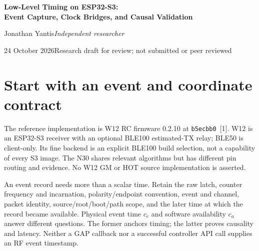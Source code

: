 \documentclass[10pt,letterpaper]{article}
\newcommand{\codepin}{\texttt{b5ecbb0}}
\begin{document}
\begin{center}
{\LARGE\bfseries Low-Level Timing on ESP32-S3:\\[3pt] Event Capture, Clock Bridges, and Causal Validation}\par
\vspace{7pt}Jonathan Yantis\quad\textit{Independent researcher}\par
24 October 2026\quad Research draft for review; not submitted or peer reviewed
\end{center}
\vspace{-4pt}
\begin{abstract}\noindent
Nanosecond arithmetic is useful only after a timestamp identifies a physical event, its clock domain, and the model available when that event occurred. This implementation paper explains the current PToB ESP32-S3 techniques: a continuous 80 MHz MCPWM capture counter, exact retained-packet association, driver-owned software latches, narrow instruction-RAM clock-read apertures, capture-frozen predictions, dense channel-aware fitting, bounded phase slew, and a separate causal GNSS witness. Four validated Bluetooth-clock projections estimate a programmed transmit time; no physical RF transmit timestamp is claimed. A finite W12 receive observation retained 600/600 relative-PPS samples with 40.795 ns bias-inclusive RMS and 128 ns maximum absolute residual. A downstream witness retained 494 eligible of 600 logged samples and a 372 ns maximum. These are separate, source-relative observations; RF endpoint, reference delay, absolute UTC, transferability and full timing certification remain unqualified. Concrete contracts, equations, pseudocode, failure cases and offline commands are provided for implementers adapting the methods to other systems.
\end{abstract}
\vspace{-4pt}
\section{Start with an event and coordinate contract}
The reference implementation is W12 RC firmware 0.2.10 at \codepin\ [1]. W12 is an ESP32-S3 receiver with an optional BLE100 estimated-TX relay; BLE50 is client-only. Its fine backend is an explicit BLE100 build selection, not a capability of every S3 image. The N30 shares relevant algorithms but has different pin routing and evidence. No W12 GM or HOT source implementation is asserted.

An event record needs more than a scalar time. Retain the raw latch, counter frequency and incarnation, polarity/endpoint convention, event and channel, packet identity, source/root/boot/path scope, and the later time at which the record became available. Physical event time $c_e$ and software availability $c_a$ answer different questions. The former anchors timing; the latter proves causality and latency. Neither a GAP callback nor a successful controller API call supplies an RF event timestamp.
\end{document}
